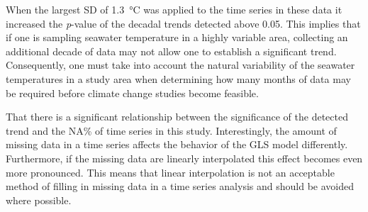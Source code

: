 \documentclass{ametsoc}
\begin{document}
When the largest SD of \SI{1.3}{\degreeCelsius} was applied to the time series in these data it increased the \emph{p}-value of the decadal trends detected above 0.05. This implies that if one is sampling seawater temperature in a highly variable area, collecting an additional decade of data may not allow one to establish a significant trend. Consequently, one must take into account the natural variability of the seawater temperatures in a study area when determining how many months of data may be required before climate change studies become feasible.

That there is a significant relationship between the significance of the detected trend and the NA\% of time series in this study. Interestingly, the amount of missing data in a time series affects the behavior of the GLS model differently. Furthermore, if the missing data are linearly interpolated this effect becomes even more pronounced. This means that linear interpolation is not an acceptable method of filling in missing data in a time series analysis and should be avoided where possible.
\end{document}
